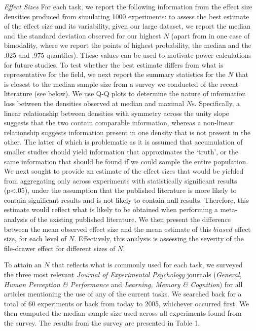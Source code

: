 \documentclass{article}
\begin{document}
\emph{Effect Sizes}
For each task, we report the following information from the effect size densities produced from simulating 1000 experiments: to assess the best estimate of the effect size and its variability, given our large dataset, we report the median and the standard deviation observed for our highest \(N\) (apart from in one case of bimodality, where we report the points of highest probability, the median and the .025 and .975 quantiles). These values can be used to motivate power calculations for future studies. To test whether the best estimate differs from what is representative for the field, we next report the summary statistics for the \(N\) that is closest to the median sample size from a survey we conducted of the recent literature (see below). We use Q-Q plots to determine the nature of information loss between the densities observed at median and maximal \(N\)s. Specifically, a linear relationship between densities with symmetry across the unity slope suggests that the two contain comparable information, whereas a non-linear relationship suggests information present in one density that is not present in the other. The latter of which is problematic as it is assumed that accumulation of smaller studies should yield information that approximates the `truth', or the same information that should be found if we could sample the entire population. We next sought to provide an estimate of the effect sizes that would be yielded from aggregating only across experiments with statistically significant results (p\textless.05), under the assumption that the published literature is more likely to contain significant results and is not likely to contain null results. Therefore, this estimate would reflect what is likely to be obtained when performing a meta-analysis of the existing published literature. We then present the difference between the mean observed effect size and the mean estimate of this \(biased\) effect size, for each level of \(N\). Effectively, this analysis is assessing the severity of the file-drawer effect for different sizes of \(N\).

To attain an \(N\) that reflects what is commonly used for each task, we surveyed the three most relevant \emph{Journal of Experimental Psychology} journals (\emph{General}, \emph{Human Perception \& Performance} and \emph{Learning, Memory \& Cognition}) for all articles mentioning the use of any of the current tasks. We searched back for a total of 60 experiments or back from today to 2005, whichever occurred first. We then computed the median sample size used across all experiments found from the survey. The results from the survey are presented in Table 1.
\end{document}

